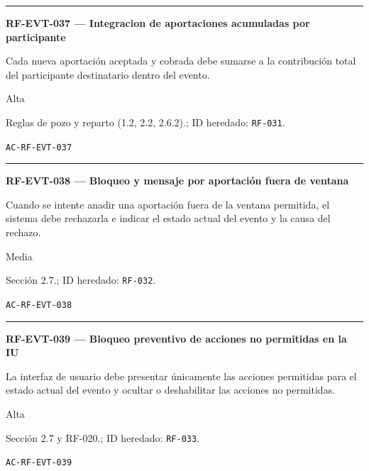 \documentclass[10pt,letterpaper]{article}
\begin{document}
\vspace{0.25em}\hrule\vspace{0.65em}
\noindent\textbf{RF-EVT-037 --- Integracion de aportaciones acumuladas por participante}\par
\begin{description}[style=nextline,leftmargin=3.15cm,labelwidth=2.8cm,font=\normalfont\bfseries]
\item[Obligación] Cada nueva aportación aceptada y cobrada debe sumarse a la contribución total del participante destinatario dentro del evento.
\item[Prioridad] Alta
\item[Procedencia] Reglas de pozo y reparto (1.2, 2.2, 2.6.2).; ID heredado: \texttt{RF-031}.
\item[Verificación] \texttt{AC-RF-EVT-037}
\end{description}
\vspace{0.25em}\hrule\vspace{0.65em}
\noindent\textbf{RF-EVT-038 --- Bloqueo y mensaje por aportación fuera de ventana}\par
\begin{description}[style=nextline,leftmargin=3.15cm,labelwidth=2.8cm,font=\normalfont\bfseries]
\item[Obligación] Cuando se intente anadir una aportación fuera de la ventana permitida, el sistema debe rechazarla e indicar el estado actual del evento y la causa del rechazo.
\item[Prioridad] Media
\item[Procedencia] Sección 2.7.; ID heredado: \texttt{RF-032}.
\item[Verificación] \texttt{AC-RF-EVT-038}
\end{description}
\vspace{0.25em}\hrule\vspace{0.65em}
\noindent\textbf{RF-EVT-039 --- Bloqueo preventivo de acciones no permitidas en la IU}\par
\begin{description}[style=nextline,leftmargin=3.15cm,labelwidth=2.8cm,font=\normalfont\bfseries]
\item[Obligación] La interfaz de usuario debe presentar únicamente las acciones permitidas para el estado actual del evento y ocultar o deshabilitar las acciones no permitidas.
\item[Prioridad] Alta
\item[Procedencia] Sección 2.7 y RF-020.; ID heredado: \texttt{RF-033}.
\item[Verificación] \texttt{AC-RF-EVT-039}
\end{description}
\end{document}
